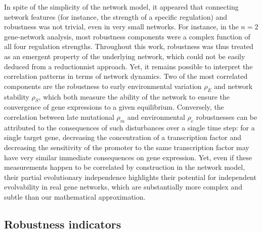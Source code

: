 \documentclass[10pt,a4paper]{article}
\newcommand{\stability}{{\rho_S}}
\newcommand{\earlyenv}{{\rho_E}}
\newcommand{\lateenv}{{\rho_e}}
\newcommand{\latemut}{{\rho_m}}
\begin{document}
In spite of the simplicity of the network model, it appeared that connecting network features (for instance, the strength of a specific regulation) and robustness was not trivial, even in very small networks. For instance, in the $n=2$ gene-network analysis, most robustness components were a complex function of all four regulation strengths. Throughout this work, robustness was thus treated as an emergent property of the underlying network, which could not be easily deduced from a reductionnist approach. Yet, it remains possible to interpret the correlation patterns in terms of network dynamics. Two of the most correlated components are the robustness to early environmental variation $\earlyenv$ and network stability $\stability$, which both measure the ability of the network to ensure the convergence of gene expressions to a given equilibrium. Conversely, the correlation between late mutational $\latemut$ and environmental $\lateenv$ robustnesses can be attributed to the consequences of such disturbances over a single time step: for a single target gene, decreasing the concentration of a transcription factor and decreasing the sensitivity of the promoter to the same transcription factor may have very similar immediate consequences on gene expression. Yet, even if these measurements happen to be correlated by construction in the network model, their partial evolutionary independence highlights their potential for independent evolvability in real gene networks, which are substantially more complex and subtle than our mathematical approximation. 

\subsection{Robustness indicators}
\end{document}
